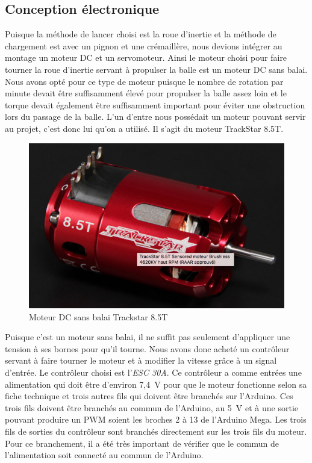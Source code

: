 \subsection{Conception électronique}

Puisque la méthode de lancer choisi est la roue d’inertie et la méthode de chargement est avec un pignon et une crémaillère, nous devions intégrer au montage un moteur DC et un servomoteur.
Ainsi le moteur choisi pour faire tourner la roue d’inertie servant à propulser la balle est un moteur DC sans balai.
Nous avons opté pour ce type de moteur puisque le nombre de rotation par minute devait être suffisamment élevé pour propulser la balle assez loin et le torque devait également être suffisamment important pour éviter une obstruction lors du passage de la balle.
L’un d’entre nous possédait un moteur pouvant servir au projet, c’est donc lui qu’on a utilisé.
Il s’agit du moteur TrackStar 8.5T.

\begin{figure}[h!]
    \centering
    \includegraphics[width=0.4\linewidth]{img/s2/elec/moteurDCsansbalai}
    \caption{Moteur DC sans balai Trackstar 8.5T}
    \label{fig:s2-elec-moteurDCsansbalai}
\end{figure}

Puisque c’est un moteur sans balai, il ne suffit pas seulement d’appliquer une tension à ses bornes pour qu’il tourne.
Nous avons donc acheté un contrôleur servant à faire tourner le moteur et à modifier la vitesse grâce à un signal d'entrée.
Le contrôleur choisi est l'\emph{ESC 30A}.
Ce contrôleur a comme entrées une alimentation qui doit être d’environ 7,4~V pour que le moteur fonctionne selon sa fiche technique \cite{noauthor_trackstar_nodate} et trois autres fils qui doivent être branchés sur l’Arduino.
Ces trois fils doivent être branchés au commun de l’Arduino, au 5~V et à une sortie pouvant produire un PWM soient les broches 2 à 13 de l’Arduino Mega.
Les trois fils de sorties du contrôleur sont branchés directement sur les trois fils du moteur.
Pour ce branchement, il a été très important de vérifier que le commun de l’alimentation soit connecté au commun de l’Arduino.

